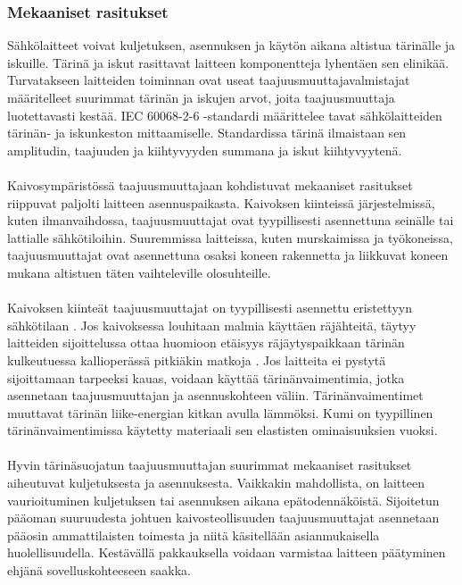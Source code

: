 \documentclass[finnish,12pt,a4paper,pdftex,elec,utf8]{aaltothesis}
\begin{document}
\subsubsection{Mekaaniset rasitukset}
Sähkölaitteet voivat kuljetuksen, asennuksen ja käytön aikana altistua tärinälle ja iskuille. Tärinä ja iskut rasittavat laitteen komponentteja lyhentäen sen elinikää. Turvatakseen laitteiden toiminnan ovat useat taajuusmuuttajavalmistajat määritelleet suurimmat tärinän ja iskujen arvot, joita taajuusmuuttaja luotettavasti kestää. IEC 60068-2-6 -standardi \cite{IEC60068} määrittelee tavat sähkölaitteiden tärinän- ja iskunkeston mittaamiselle. Standardissa tärinä ilmaistaan sen amplitudin, taajuuden ja kiihtyvyyden summana ja iskut kiihtyvyytenä.
\\\\
Kaivosympäristössä taajuusmuuttajaan kohdistuvat mekaaniset rasitukset riippuvat paljolti laitteen asennuspaikasta. Kaivoksen kiinteissä järjestelmissä, kuten ilmanvaihdossa, taajuusmuuttajat ovat tyypillisesti asennettuna seinälle tai lattialle sähkötiloihin. Suuremmissa laitteissa, kuten murskaimissa ja työkoneissa, taajuusmuuttajat ovat asennettuna osaksi koneen rakennetta ja liikkuvat koneen mukana altistuen täten vaihteleville olosuhteille.
\\\\
Kaivoksen kiinteät taajuusmuuttajat on tyypillisesti asennettu eristettyyn sähkötilaan \cite{MyyntiHaastattelu}. Jos kaivoksessa louhitaan malmia käyttäen räjähteitä, täytyy laitteiden sijoittelussa ottaa huomioon etäisyys räjäytyspaikkaan tärinän kulkeutuessa kallioperässä pitkiäkin matkoja \cite{Sirkko}. Jos laitteita ei pystytä sijoittamaan tarpeeksi kauas, voidaan käyttää tärinänvaimentimia, jotka asennetaan taajuusmuuttajan ja asennuskohteen väliin. Tärinänvaimentimet muuttavat tärinän liike-energian kitkan avulla lämmöksi. Kumi on tyypillinen tärinänvaimentimissa käytetty materiaali sen elastisten ominaisuuksien vuoksi.
\\\\
Hyvin tärinäsuojatun taajuusmuuttajan suurimmat mekaaniset rasitukset aiheutuvat kuljetuksesta ja asennuksesta. Vaikkakin mahdollista, on laitteen vaurioituminen kuljetuksen tai asennuksen aikana epätodennäköistä. Sijoitetun pääoman suuruudesta johtuen kaivosteollisuuden taajuusmuuttajat asennetaan pääosin ammattilaisten toimesta ja niitä käsitellään asianmukaisella huolellisuudella. Kestävällä pakkauksella voidaan varmistaa laitteen päätyminen ehjänä sovelluskohteeseen saakka.
\end{document}
